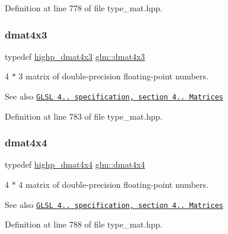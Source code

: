 Definition at line 778 of file type\+\_\+mat.\+hpp.

\mbox{\label{group__core__types_gaa4a157ac183c5bd5dcbd555a94b1b505}} 
\subsubsection{\texorpdfstring{dmat4x3}{dmat4x3}}
{\footnotesize\ttfamily typedef \hyperlink{group__core__precision_gaf8aeba0eecc5c651e0f06414b6e37754}{highp\+\_\+dmat4x3} \hyperlink{group__core__types_gaa4a157ac183c5bd5dcbd555a94b1b505}{glm\+::dmat4x3}}

4 $\ast$ 3 matrix of double-\/precision floating-\/point numbers.

\begin{DoxySeeAlso}{See also}
\href{http://www.opengl.org/registry/doc/GLSLangSpec.4.20.8.pdf}{\tt G\+L\+SL 4.. specification, section 4.. Matrices} 
\end{DoxySeeAlso}


Definition at line 783 of file type\+\_\+mat.\+hpp.

\mbox{\label{group__core__types_ga54d90d4b902d93638b906571af215bb1}} 
\subsubsection{\texorpdfstring{dmat4x4}{dmat4x4}}
{\footnotesize\ttfamily typedef \hyperlink{group__core__precision_ga1c0a2edbde597b59e9005691a224b208}{highp\+\_\+dmat4x4} \hyperlink{group__core__types_ga54d90d4b902d93638b906571af215bb1}{glm\+::dmat4x4}}

4 $\ast$ 4 matrix of double-\/precision floating-\/point numbers.

\begin{DoxySeeAlso}{See also}
\href{http://www.opengl.org/registry/doc/GLSLangSpec.4.20.8.pdf}{\tt G\+L\+SL 4.. specification, section 4.. Matrices} 
\end{DoxySeeAlso}


Definition at line 788 of file type\+\_\+mat.\+hpp.

\mbox{\label{group__core__types_gae6727259898288cae197724d5f172b3b}} 
